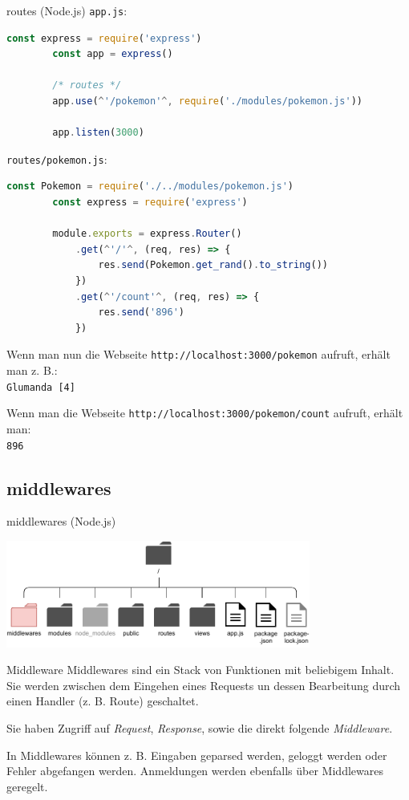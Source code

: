 \begin{example}{routes (Node.js)}
    \texttt{app.js}:
    \begin{lstlisting}[language=JavaScript]
        const express = require('express')
        const app = express()

        /* routes */
        app.use(^'/pokemon'^, require('./modules/pokemon.js'))

        app.listen(3000)
    \end{lstlisting}

    \texttt{routes/pokemon.js}:
    \begin{lstlisting}[language=JavaScript]
        const Pokemon = require('./../modules/pokemon.js')
        const express = require('express')
        
        module.exports = express.Router()
            .get(^'/'^, (req, res) => {
                res.send(Pokemon.get_rand().to_string())
            })
            .get(^'/count'^, (req, res) => {
                res.send('896')
            })
    \end{lstlisting}

    Wenn man nun die Webseite \texttt{http://localhost:3000/pokemon} aufruft, erhält man z. B.:\\
    \texttt{Glumanda [4]}

    Wenn man die Webseite \texttt{http://localhost:3000/pokemon/count} aufruft, erhält man:\\
    \texttt{896}
\end{example}

\subsection{middlewares}

\begin{bonus}{middlewares (Node.js)}
    \begin{center}
        \includegraphics[width=0.75\textwidth]{includes/figures/bonus_nodejs_middlewares.pdf}
    \end{center}
\end{bonus}

\begin{defi}{Middleware}
    Middlewares sind ein Stack von Funktionen mit beliebigem Inhalt.
    Sie werden zwischen dem Eingehen eines Requests un dessen Bearbeitung durch einen Handler (z. B. Route) geschaltet.

    Sie haben Zugriff auf \emph{Request}, \emph{Response}, sowie die direkt folgende \emph{Middleware}.

    In Middlewares können z. B. Eingaben geparsed werden, geloggt werden oder Fehler abgefangen werden.
    Anmeldungen werden ebenfalls über Middlewares geregelt.
\end{defi}


